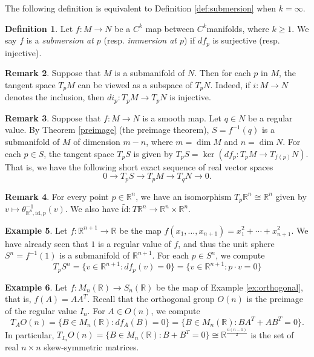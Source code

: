 \documentclass{amsart}
\numberwithin{equation}{section}
\newcommand{\bR}{\mathbb{R}}
\theoremstyle{definition}
\newtheorem{definition}{Definition} [section]
\newtheorem{example}[definition]{Example}
\newtheorem{remark}[definition]{Remark}
\theoremstyle{theorem}
\begin{document}
The following definition is equivalent to Definition \ref{def:submersion} when $k=\infty$.
\begin{definition}
Let $f : M \to N$ be a $C^k$ map between $C^k$manifolds, where $k\geq 1$. 
We say $f$ is a {\em submersion at $p$} (resp. {\em  immersion at $p$}) if $df_p$ is surjective (resp. injective).
\end{definition}

\begin{remark}
Suppose that $M$ is a submanifold of $N$. Then for each $p$ in $M$, the tangent space $T_pM$ can be viewed as a subspace of $T_pN$. Indeed, if $i : M \to N$ denotes the inclusion, then $di_p : T_pM \to T_pN$ is injective. 
\end{remark}


\begin{remark}
Suppose that $f : M \to N$ is a smooth map. Let $q \in N$ be a regular value. By Theorem \ref{preimage} (the preimage
theorem),  $S=f^{-1}(q)$ is a submanifold of $M$ of dimension $m - n$, where $m=\dim M$ and 
$n=\dim N$. For each $p \in S$, the tangent space $T_pS$ is given by $T_pS = \ker (df_p : T_pM \to T_{f(p)}N)$. 
That is, we have the following short exact sequence of real vector spaces 
\[
0 \longrightarrow T_pS \longrightarrow T_pM \longrightarrow T_qN \longrightarrow 0.
\]
\end{remark}

\begin{remark} For every point $p\in \bR^n$, we have an isomorphism 
$T_p\bR^n\cong \bR^n$ given by $v\mapsto \theta_{\bR^n,\mathrm{id},p}^{-1}(v)$.
We also have $\tilde{\mathrm{id}}: T \bR^n \to \bR^n\times \bR^n$.
\end{remark}

\begin{example}
Let $f : \bR^{n+1} \to \bR$ be the map $f(x_1, \ldots, x_{n+1}) = x_1^2 + \cdots + x_{n+1}^2$. We have already seen that $1$ is a regular value of $f$, and thus the unit sphere $S^n=f^{-1}(1)$ is a submanifold of $\mathbb{R}^{n+1}$. 
For each $p \in S^n$, we compute 
\[
T_pS^n = \{v \in \bR^{n+1} : df_p(v) = 0\} = \{v \in \bR^{n+1} : p \cdot v = 0\}
\]
\end{example}

\begin{example}
Let $f : M_n(\mathbb{R}) \to S_n(\mathbb{R})$ be the map of Example \ref{ex:orthogonal}, that is, $f(A) = AA^T$. 
Recall that the orthogonal group $O(n)$ is the preimage of the regular value $I_n$. For $A \in O(n)$, we compute 
\[
T_AO(n) = \{B \in M_n(\bR) : df_A(B) = 0\} = \{B \in M_n(\bR) : BA^T + AB^T = 0\}.
\]
In particular, $T_{I_n}O(n)=\{ B\in M_n(\bR): B+B^T=0\} \cong \bR^{\frac{n(n-1)}{2}}$ is the 
set of real $n\times n$ skew-symmetric matrices.  
\end{example}
\end{document}
